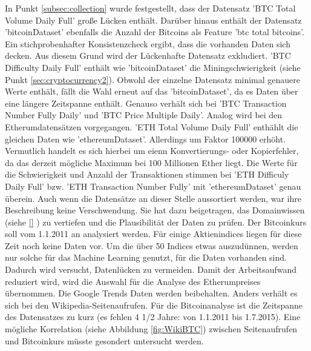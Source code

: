 In Punkt \ref{subsec:collection} wurde festgestellt, dass der Datensatz 'BTC \textunderscore Total \textunderscore Volume \textunderscore Daily \textunderscore Full' große Lücken enthält. Darüber hinaus enthält der Datensatz 'bitcoinDataset' ebenfalls die Anzahl der Bitcoins als Feature 'btc \textunderscore total \textunderscore bitcoins'. Ein stichprobenhafter Konsistenzcheck ergibt, dass die vorhanden Daten sich decken. Aus diesem Grund wird der Lückenhafte Datensatz exkludiert. 
'BTC \textunderscore Difficulty \textunderscore Daily \textunderscore Full' enthält wie 'bitcoinDataset' die Miningschwierigkeit (siehe Punkt \ref{sec:cryptocurrency2}). Obwohl der einzelne Datensatz minimal genauere Werte enthält, fällt die Wahl erneut auf das 'bitcoinDataset', da es Daten über eine längere Zeitspanne enthält. Genauso verhält sich bei 'BTC \textunderscore Transaction \textunderscore Number \textunderscore Fully \textunderscore Daily' und 'BTC \textunderscore Price \textunderscore Multiple \textunderscore Daily'. 
Analog wird bei den Etherumdatensätzen vorgegangen. 'ETH \textunderscore Total \textunderscore Volume \textunderscore Daily \textunderscore Full' enthählt die gleichen Daten wie 'ethereumDataset'. Allerdings um Faktor 100000 erhöht. Vermutlich handelt es sich hierbei um eienn Konvertierungs- oder Kopierfehler, da das derzeit mögliche Maximum bei 100 Millionen Ether liegt. Die Werte für die Schwierigkeit und Anzahl der Transaktionen stimmen bei 'ETH \textunderscore Difficuly \textunderscore Daily \textunderscore Full' bzw. 'ETH \textunderscore Transaction \textunderscore Number \textunderscore Fully' mit 'ethereumDataset' genau überein. 
Auch wenn die Datensätze an dieser Stelle aussortiert werden, war ihre Beschreibung keine Verschwendung. Sie hat dazu beigetragen, das Domainwissen (siehe \ref{} ) zu vertiefen und die Plausibilität der Daten zu prüfen.
Der Bitcoinkurs soll vom 1.1.2011 an analysiert werden. Für einige Aktienindices liegen für diese Zeit noch keine Daten vor. Um die über 50 Indices etwas auszudünnen, werden nur solche für das Machine Learning genutzt, für die Daten vorhanden sind. Dadurch wird versucht, Datenlücken zu vermeiden. Damit der Arbeitsaufwand reduziert wird, wird die Auswahl für die Analyse des Etherumpreises übernommen. Die Google Trends Daten werden beibehalten. Anders verhält es sich bei den Wikipedia-Seitenaufrufen. Für die Bitcoinanalyse ist die Zeitspanne des Datensatzes zu kurz (es fehlen 4 1/2 Jahre: von 1.1.2011 bis 1.7.2015). Eine mögliche Korrelation (siehe Abbildung \ref{fig:WikiBTC}) zwischen Seitenaufrufen und Bitcoinkurs müsste gesondert untersucht werden. 
